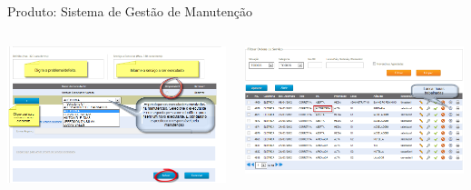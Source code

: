 \begin{frame}{Produto: Sistema de Gestão de Manutenção}
	\begin{columns}
		\begin{column}{0.45\textwidth}
			\includegraphics[width=1\textwidth]{imagens/sgm-07}
		\end{column}
		\begin{column}{0.45\textwidth}
			\includegraphics[width=1\textwidth]{imagens/sgm-08}
		\end{column}
	\end{columns}
	
\end{frame}